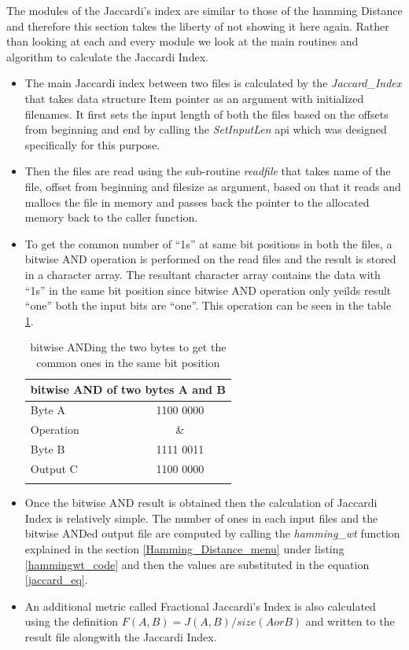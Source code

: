 The modules of the Jaccardi's index are similar to those of the hamming Distance and therefore this section takes the liberty of not showing it here again.
Rather than looking at each and every module we look at the main routines and algorithm to calculate the Jaccardi Index.
\begin{itemize}
	\item The main Jaccardi index between two files is calculated by the \emph{Jaccard\_Index} that takes data structure Item pointer as an argument with initialized filenames. It first sets the input length of both the files based on the offsets from beginning and end by calling the \emph{SetInputLen} api which was designed specifically for this purpose.
	\item Then the files are read using the sub-routine \emph{readfile} that takes name of the file, offset from beginning and filesize as 		argument, based on that it reads and mallocs the file in memory and passes back the pointer to the allocated memory back to the caller function.
	\item To get the common number of ``1s'' at same bit positions in both the files, a bitwise AND operation is performed on the read files and the result is stored in a character array. The resultant character array contains the data with ``1s'' in the same bit position since bitwise AND operation only yeilds result ``one'' both the input bits are ``one''. This operation can be seen in the table \ref{bitwise_AND}.

\begin{table}[!ht]
\begin{center}
\begin{tabular}{lc}
\toprule
\multicolumn{2}{c}{\textbf{bitwise AND of two bytes A and B}}\\
\midrule
Byte A &   1100 0000 \\
Operation & \&\\
Byte B &   1111 0011 \\
Output C &   1100 0000 \\
\addlinespace
\bottomrule
\end{tabular}
\end{center}
\caption{bitwise ANDing the two bytes to get the common ones in the same bit position}
\label{bitwise_AND}
\end{table}

	\item Once the bitwise AND result is obtained then the calculation of Jaccardi Index is relatively simple. The number of ones in each input files and the bitwise ANDed output file are computed by calling the \emph{hamming\_wt} function explained in the section \ref{Hamming_Distance_menu} under listing \ref{hammingwt_code} and then the values are substituted in the equation \ref{jaccard_eq}.
	\item An additional metric called Fractional Jaccardi's Index is also calculated using the definition $F(A, B) = J(A, B)/ size(A or B)$ and written to the result file alongwith the Jaccardi Index.
\end{itemize}

